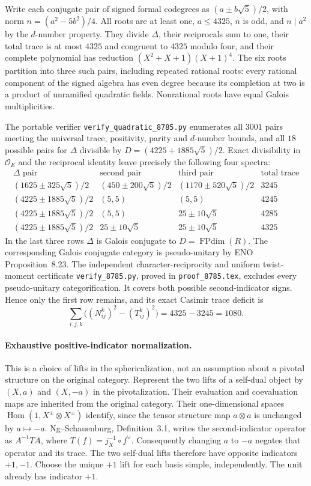 Write each conjugate pair of signed formal codegrees as
$(a\pm b\sqrt5)/2$, with norm $n=(a^2-5b^2)/4$.
All roots are at least one, $a\le4325$, $n$ is odd, and $n\mid a^2$
by the $d$-number property. They divide $\Delta$, their reciprocals sum
to one, their total trace is at most $4325$ and congruent to $4325$
modulo four, and their complete polynomial has reduction
$(X^2+X+1)(X+1)^4$.
The six roots partition into three such pairs, including repeated
rational roots: every rational component of the signed algebra has even
degree because its completion at two is a product of unramified
quadratic fields. Nonrational roots have equal Galois multiplicities.

The portable verifier \texttt{verify\_quadratic\_8785.py} enumerates
all $3001$ pairs meeting the universal trace, positivity, parity and
$d$-number bounds, and all $18$ possible pairs for $\Delta$ divisible by
$D=(4225+1885\sqrt5)/2$. Exact divisibility in $\mathcal O_E$ and the
reciprocal identity leave precisely the following four spectra:
\[
\begin{array}{c|c|c|r}
 \Delta\text{ pair}&\text{second pair}&\text{third pair}&\text{total trace}\\\hline
 (1625\pm325\sqrt5)/2&(450\pm200\sqrt5)/2&(1170\pm520\sqrt5)/2&3245\\
 (4225\pm1885\sqrt5)/2&(5,5)&(5,5)&4245\\
 (4225\pm1885\sqrt5)/2&(5,5)&25\pm10\sqrt5&4285\\
 (4225\pm1885\sqrt5)/2&25\pm10\sqrt5&25\pm10\sqrt5&4325
\end{array}
\]
In the last three rows $\Delta$ is Galois conjugate to $D=\operatorname{FPdim}(R)$.
The corresponding Galois conjugate category is pseudo-unitary by
ENO Proposition~8.23. The independent character-reciprocity and
uniform twist-moment certificate \texttt{verify\_8785.py}, proved in
\texttt{proof\_8785.tex}, excludes every pseudo-unitary categorification.
It covers both possible second-indicator signs. Hence only the first
row remains, and its exact Casimir trace deficit is
\[
 \sum_{i,j,k}\bigl((N_{ij}^k)^2-(T_{ij}^k)^2\bigr)=4325-3245=1080.
 \tag{8785-D}
\]

\paragraph{Exhaustive positive-indicator normalization.}
This is a choice of lifts in the sphericalization, not an assumption
about a pivotal structure on the original category. Represent the two
lifts of a self-dual object by $(X,a)$ and $(X,-a)$ in the pivotalization.
Their evaluation and coevaluation maps are inherited from the original
category. Their one-dimensional spaces
$\operatorname{Hom}(1,X^\pm\otimes X^\pm)$ identify, since the tensor
structure map $a\otimes a$ is unchanged by $a\mapsto-a$.
Ng--Schauenburg, Definition~3.1, writes the second-indicator operator as
$A^{-1}TA$, where $T(f)=j_X^{-1}\circ f^\vee$.
Consequently changing $a$ to $-a$ negates that operator and its trace.
The two self-dual lifts therefore have opposite indicators $+1,-1$.
Choose the unique $+1$ lift for each basis simple, independently.
The unit already has indicator $+1$.

